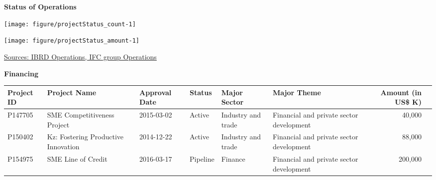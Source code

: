 \documentclass{article}\usepackage[]{graphicx}\usepackage[]{color}
\makeatletter
\def\maxwidth{ %
  \ifdim\Gin@nat@width>\linewidth
    \linewidth
  \else
    \Gin@nat@width
  \fi
}
\makeatother
\begin{document}
\begin{minipage}[b]{0.99\textwidth} %
\vspace*{0.5cm}
\raggedright{\color{white!30!blue} \textbf{\large Status of Operations}}
     \vspace*{0.5cm}
     
  \begin{minipage}[t]{0.99\textwidth}
    \begin{minipage}[c]{0.49\textwidth}
      \vspace*{0.2cm}
      \vspace*{0.3cm}


{\centering \texttt{[image: figure/projectStatus\_count-1]} 

}



      \end{minipage}
      \begin{minipage}[c]{0.49\textwidth}


{\centering \texttt{[image: figure/projectStatus\_amount-1]} 

}



      \end{minipage}
 
\raggedright{\footnotesize{\href{http://www.worldbank.org/en/topic/macroeconomics/overview}{Sources: IBRD Operations, IFC group Operations}}}
   \end{minipage}
  
   \begin{minipage}[b]{0.99\textwidth} %
     \vspace*{1cm}
     \begin{minipage}[c]{0.99\textwidth}  
     \raggedright{\color{white!30!blue} \textbf{\large Financing}}
     \vspace*{0.5cm}
     
{\footnotesize
\begin{tabular}{l>{\raggedright}p{1in}ll>{\raggedright}p{1in}>{\raggedright}p{1in}rl}
 Project ID & Project Name & Approval Date & Status & Major Sector & Major Theme & Amount (in US\$ K) &  \\ 
  \hline
P147705 & SME Competitiveness Project & 2015-03-02 & Active & Industry and trade & Financial and private sector development &  40,000 &  \\ 
  P150402 & Kz: Fostering Productive Innovation & 2014-12-22 & Active & Industry and trade & Financial and private sector development &  88,000 &  \\ 
  P154975 & SME Line of Credit & 2016-03-17 & Pipeline & Finance & Financial and private sector development & 200,000 &  \\ 
  \end{tabular}
}


\end{minipage}
\end{minipage}
\end{minipage}
\end{document}
